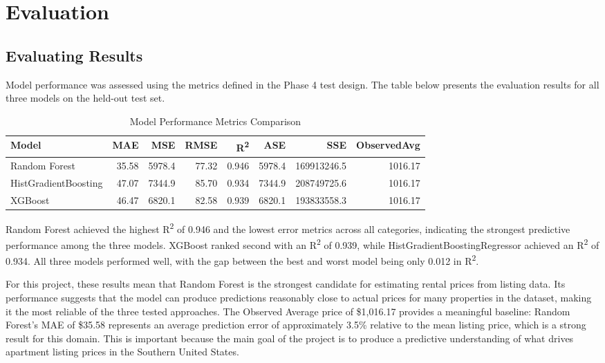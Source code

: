 \section{Evaluation}

\subsection{Evaluating Results}
\label{subsec:Evaluating Results}

\noindent
Model performance was assessed using the metrics defined in the Phase 4 test design. The table below presents the evaluation results for all three models on the held-out test set.

\begin{table}[ht]
\centering
\small
\begin{adjustbox}{max width=\textwidth}
\begin{tabular}{|l|r|r|r|r|r|r|r|}
\hline
\hline
Model & MAE & MSE & RMSE & R\textsuperscript{2} & ASE & SSE & ObservedAvg\\
\hline
Random Forest & 35.58 & 5978.4 & 77.32 & 0.946 & 5978.4 & 169913246.5 & 1016.17\\
HistGradientBoosting & 47.07 & 7344.9 & 85.70 & 0.934 & 7344.9 & 208749725.6 & 1016.17\\
XGBoost & 46.47 & 6820.1 & 82.58 & 0.939 & 6820.1 & 193833558.3 & 1016.17\\
\hline
\hline
\end{tabular}
\end{adjustbox}
\caption{Model Performance Metrics Comparison}
\label{tab:model_performance}
\end{table}

\noindent
Random Forest achieved the highest R\textsuperscript{2} of 0.946 and the lowest error metrics across all categories, indicating the strongest predictive performance among the three models. XGBoost ranked second with an R\textsuperscript{2} of 0.939, while HistGradientBoostingRegressor achieved an R\textsuperscript{2} of 0.934. All three models performed well, with the gap between the best and worst model being only 0.012 in R\textsuperscript{2}.

\noindent
For this project, these results mean that Random Forest is the strongest candidate for estimating rental prices from listing data. Its performance suggests that the model can produce predictions reasonably close to actual prices for many properties in the dataset, making it the most reliable of the three tested approaches. The Observed Average price of \$1,016.17 provides a meaningful baseline: Random Forest's MAE of \$35.58 represents an average prediction error of approximately 3.5\% relative to the mean listing price, which is a strong result for this domain. This is important because the main goal of the project is to produce a predictive understanding of what drives apartment listing prices in the Southern United States.

